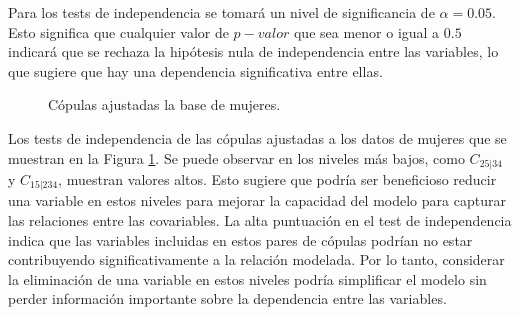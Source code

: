 Para los tests de independencia se tomará un nivel de significancia de $\alpha = 0.05$. Esto significa que cualquier valor de $p-valor$ que sea menor o igual a $0.5$ indicará que se rechaza la hipótesis nula de independencia entre las variables, lo que sugiere que hay una dependencia significativa entre ellas.

\begin{figure}[H]
 \centering
    \caption{Cópulas ajustadas la base de mujeres.}
    \label{fig:copulasTestMu}
\end{figure}

Los tests de independencia de las cópulas ajustadas a los datos de mujeres que se muestran en la Figura \ref{fig:copulasTestMu}. Se puede observar en los niveles más bajos, como $C_{25|34}$ y $C_{15|234}$, muestran valores altos. Esto sugiere que podría ser beneficioso reducir una variable en estos niveles para mejorar la capacidad del modelo para capturar las relaciones entre las covariables. La alta puntuación en el test de independencia indica que las variables incluidas en estos pares de cópulas podrían no estar contribuyendo significativamente a la relación modelada. Por lo tanto, considerar la eliminación de una variable en estos niveles podría simplificar el modelo sin perder información importante sobre la dependencia entre las variables.

